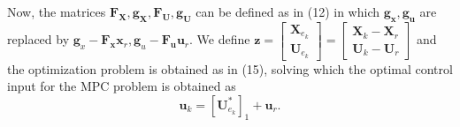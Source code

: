 \documentclass{article}
\begin{document}
Now, the matrices $\textbf{F}_{\textbf{X}},\textbf{g}_{\textbf{X}},\textbf{F}_{\textbf{U}},\textbf{g}_{\textbf{U}}$ can be defined as in (12) in which $\textbf{g}_{\textbf{x}},\textbf{g}_{\textbf{u}}$ are replaced by $\textbf{g}_{x}-\textbf{F}_{\textbf{x}}\textbf{x}_{r},\textbf{g}_{u}-\textbf{F}_{\textbf{u}}\textbf{u}_{r}.$ We define $\textbf{z}=\left[\begin{matrix} \textbf{X}_{e_k}\\ \textbf{U}_{e_k} \end{matrix}\right]=\left[ \begin{matrix} \textbf{X}_{k}-\textbf{X}_{r} \\\textbf{U}_{k}-\textbf{U}_{r} \end{matrix}\right]$ and the optimization problem is obtained as in (15), solving which the optimal control input for the MPC problem is obtained as
\begin{equation}
    \textbf{u}_{k}=[\textbf{U}_{e_k}^{*}]_{1}+\textbf{u}_{r}.
\end{equation}
\end{document}
